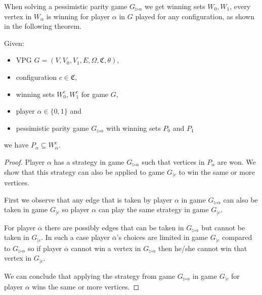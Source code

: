 When solving a pessimistic parity game $G_{\triangleright\alpha}$ we get winning sets $W_0,W_1$, every vertex in $W_\alpha$ is winning for player $\alpha$ in $G$ played for any configuration, as shown in the following theorem.
\begin{theorem}
	\label{the_pess_is_winning_for_all_conf}
	Given:
	\begin{itemize}
		\item VPG $G = (V,V_0,V_1,E,\Omega,\mathfrak{C},\theta)$,
		\item configuration $c \in \mathfrak{C}$,
		\item winning sets $W_0^c, W_1^c$ for game $G$,
		\item player $\alpha \in \{0,1\}$ and
		\item pessimistic parity game $G_{\triangleright\alpha}$ with winning sets $P_0$ and $P_1$
	\end{itemize}
	we have $P_\alpha \subseteq W_\alpha^c$.
	\begin{proof}
		Player $\alpha$ has a strategy in game $G_{\triangleright\alpha}$ such that vertices in $P_\alpha$ are won. We show that this strategy can also be applied to game $G_{|c}$ to win the same or more vertices.
		
		First we observe that any edge that is taken by player $\alpha$ in game $G_{\triangleright\alpha}$ can also be taken in game $G_{|c}$ so player $\alpha$ can play the same strategy in game $G_{|c}$.
		
		For player $\overline{\alpha}$ there are possibly edges that can be taken in $G_{\triangleright\alpha}$ but cannot be taken in $G_{|c}$. In such a case player $\overline{\alpha}$'s choices are limited in game $G_{|c}$ compared to $G_{\triangleright\alpha}$ so if player $\overline{\alpha}$ cannot win a vertex in $G_{\triangleright\alpha}$ then he/she cannot win that vertex in $G_{|c}$.
		
		We can conclude that applying the strategy from game $G_{\triangleright\alpha}$ in game $G_{|c}$ for player $\alpha$ wins the same or more vertices.
	\end{proof}
\end{theorem}

